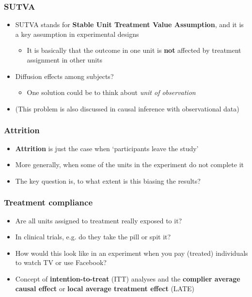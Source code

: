 \documentclass[aspectratio=43]{beamer}
\begin{document}
\begin{frame}
\frametitle{SUTVA}
\centering

\begin{itemize}
  \item SUTVA stands for \textbf{Stable Unit Treatment Value Assumption}, and it is a key assumption in experimental designs
  \begin{itemize}
    \item It is basically that the outcome in one unit is \textbf{not} affected by treatment assignment in other units
  \end{itemize}
  \item Diffusion effects among subjects?
  \begin{itemize}
    \item One solution could be to think about \textit{unit of observation}
  \end{itemize}
  \item (This problem is also discussed in causal inference with observational data)
\end{itemize}

\end{frame}

\begin{frame}
\frametitle{Attrition}
\centering

\begin{itemize}
  \item \textbf{Attrition} is just the case when `participants leave the study'
  \item More generally, when some of the units in the experiment do not complete it
  \item The key question is, to what extent is this biasing the results?
\end{itemize}

\end{frame}

\begin{frame}
\frametitle{Treatment compliance}
\centering

\begin{itemize}
  \item Are all units assigned to treatment really exposed to it?
  \item In clinical trials, e.g. do they take the pill or spit it?
  \item How would this look like in an experiment when you pay (treated) individuals to watch TV or use Facebook?
  \item Concept of \textbf{intention-to-treat} (ITT) analyses and the \textbf{complier average causal effect} or \textbf{local average treatment effect} (LATE)
\end{itemize}

\end{frame}
\end{document}
